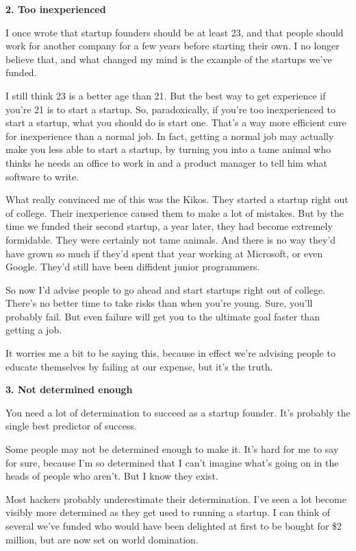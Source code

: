 \documentclass[12pt]{book}
\begin{document}
\textbf{2. Too inexperienced}

I once wrote that startup founders should be at least 23, and that
people should work for another company for a few years before starting
their own. I no longer believe that, and what changed my mind is the
example of the startups we've funded.

I still think 23 is a better age than 21. But the best way to get
experience if you're 21 is to start a startup. So, paradoxically, if
you're too inexperienced to start a startup, what you should do is start
one. That's a way more efficient cure for inexperience than a normal
job. In fact, getting a normal job may actually make you less able to
start a startup, by turning you into a tame animal who thinks he needs
an office to work in and a product manager to tell him what software to
write.

What really convinced me of this was the Kikos. They started a startup
right out of college. Their inexperience caused them to make a lot of
mistakes. But by the time we funded their second startup, a year later,
they had become extremely formidable. They were certainly not tame
animals. And there is no way they'd have grown so much if they'd spent
that year working at Microsoft, or even Google. They'd still have been
diffident junior programmers.

So now I'd advise people to go ahead and start startups right out of
college. There's no better time to take risks than when you're young.
Sure, you'll probably fail. But even failure will get you to the
ultimate goal faster than getting a job.

It worries me a bit to be saying this, because in effect we're advising
people to educate themselves by failing at our expense, but it's the
truth.

\textbf{3. Not determined enough}

You need a lot of determination to succeed as a startup founder. It's
probably the single best predictor of success.

Some people may not be determined enough to make it. It's hard for me to
say for sure, because I'm so determined that I can't imagine what's
going on in the heads of people who aren't. But I know they exist.

Most hackers probably underestimate their determination. I've seen a lot
become visibly more determined as they get used to running a startup. I
can think of several we've funded who would have been delighted at first
to be bought for \$2 million, but are now set on world domination.
\end{document}
